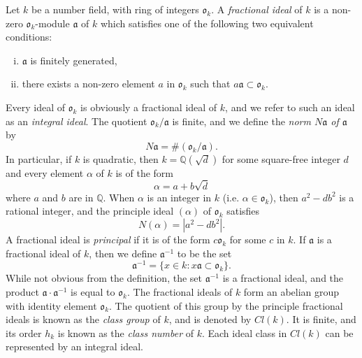 Let $k$ be a number field, with ring of integers $\mathfrak{o}_{k}$.  A
\emph{fractional ideal} of $k$ is a non-zero $\mathfrak{o}_{k}$-module $\mathfrak{a}$
of $k$ which satisfies one of the following two equivalent conditions:
\begin{enumerate}[(i)]
\item $\mathfrak{a}$ is finitely generated,
\item there exists a non-zero element $a$ in $\mathfrak{o}_{k}$ such that
  $a\mathfrak{a} \subset \mathfrak{o}_{k}$.
\end{enumerate}
Every ideal of $\mathfrak{o}_{k}$ is obviously a fractional ideal of $k$, and we
refer to such an ideal as an \emph{integral ideal}.  The quotient $\mathfrak{o}_{k} /
\mathfrak{a}$ is finite, and we define the \emph{norm $N\mathfrak{a}$ of
  $\mathfrak{a}$} by
\begin{equation*}
  N\mathfrak{a} = \# ( \mathfrak{o}_{k} / \mathfrak{a} ).
\end{equation*}
In particular, if $k$ is quadratic, then $k = \mathbb{Q}(\sqrt{d})$ for some
square-free integer $d$ and every element $\alpha$ of $k$ is of the form
\begin{equation*}
  \alpha = a + b\sqrt{d}
\end{equation*}
where $a$ and $b$ are in $\mathbb{Q}$.  When $\alpha$ is an integer in $k$
(i.e. $\alpha \in \mathfrak{o}_{k}$), then
$a^{2} - db^{2}$ is a rational integer, and the principle ideal $(\alpha)$ of
$\mathfrak{o}_{k}$ satisfies
\begin{equation*}
  N(\alpha) = |a^{2} - db^{2}|.
\end{equation*}
  A fractional ideal is \emph{principal}
if it is of the form $c\mathfrak{o}_{k}$ for some $c$ in $k$.  If $\mathfrak{a}$ is a
fractional ideal of $k$, then we define $\mathfrak{a}^{-1}$ to be the set
\begin{equation*}
  \mathfrak{a}^{-1} = \{x \in k \colon x\mathfrak{a} \subset \mathfrak{o}_{k}\}.
\end{equation*}
While not obvious from the definition, the set $\mathfrak{a}^{-1}$ is a fractional
ideal, and the product $\mathfrak{a} \cdot \mathfrak{a}^{-1}$ is equal to
$\mathfrak{o}_{k}$.  The fractional ideals of $k$ form an abelian group with identity
element $\mathfrak{o}_{k}$.  The quotient of this group by the principle fractional
ideals is known as the \emph{class group} of $k$, and is denoted by $Cl(k)$.  It is
finite, and its order $h_{k}$ is known as the \emph{class number} of $k$.  Each ideal
class in $Cl(k)$ can be represented by an integral ideal.

